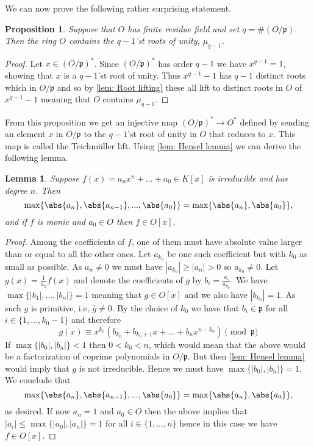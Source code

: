 \documentclass{article}
\newtheorem{proposition}{Proposition}[section]
\newtheorem{lemma}{Lemma}[section]
\newcommand{\mfrak}[1]{\mathfrak{#1}}
\numberwithin{equation}{section}
\begin{document}
We can now prove the following rather surprising statement.
\begin{proposition} \label{O contains q-1 roots of unity}
	Suppose that $O$ has finite residue field and set $q = \#(O/\mfrak p)$. Then the ring $O$ contains the $q-1$'st roots of unity, $\mu_{q-1}$.
\end{proposition}
\begin{proof}
	Let $x \in (O/\mfrak p)^*$. Since $(O/\mfrak p)^*$ has order $q-1$ we have $x^{q-1} = 1$, showing that $x$ is a $q-1$'st root of unity. Thus $x^{q-1} - 1$ has $q-1$ distinct roots which in $O/\mfrak p$ and so by \cref{lem: Root lifting} these all lift to distinct roots in $O$ of $x^{q-1} - 1$ meaning that $O$ contains $\mu_{q-1}$.
\end{proof}
From this proposition we get an injective map $(O / \mfrak p)^* \to O^*$ defined by sending an element $x$ in $O / \mfrak p$ to the $q-1$'st root of unity in $O$ that reduces to $x$. This map is called the Teichmüller lift. Using \cref{lem: Hensel lemma} we can derive the following lemma.
\begin{lemma}\label{lem: Sufficient condition for polynomial to have coefficients in valuation ring}
	Suppose $f(x) = a_n x^n + ... + a_0 \in K[x]$ is irreducible and has degree $n$. Then $$\max \{\abs{a_n}, \abs{a_{n-1}}, ..., \abs{a_0} \} = \max\{\abs{a_n}, \abs{a_0} \},$$
	and if $f$ is monic and $a_0 \in O$ then $f \in O[x]$.
\end{lemma}
\begin{proof}
	Among the coefficients of $f$, one of them must have absolute value larger than or equal to all the other ones. Let $a_{k_0}$ be one such coefficient but with $k_0$ as small as possible. As $a_n \neq 0$ we must have $|a_{k_0}| \geq |a_n| > 0$ so $a_{k_0} \neq 0$. Let $g(x) = \frac{1}{a_k}f(x)$ and denote the coefficients of $g$ by $b_i = \frac{a_i}{a_{k_0}}$. We have $\max \{|b_1|, ..., |b_n| \} = 1$ meaning that $g \in O[x]$ and we also have $|b_{k_0}| = 1$. As such $g$ is primitive, i.e, $\overline g \neq 0$. By the choice of $k_0$ we have that $b_i \in \mfrak p$ for all $i \in \{1, ..., k_0-1 \}$ and therefore
	$$g(x) \equiv x^{k_0}(b_{k_0} + b_{k_0+1} x+ ... + b_n x^{n - k_0}) \pmod {\mfrak p}$$
	If $\max\{|b_0|, |b_n| \} < 1$ then $0 < k_0 < n$, which would mean that the above would be a factorization of coprime polynomials in $O / \mfrak p$. But then \cref{lem: Hensel lemma} would imply that $g$ is not irreducible. Hence we must have $\max\{|b_0|, |b_n| \} = 1$. We conclude that
	$$\max \{\abs{a_n}, \abs{a_{n-1}}, ..., \abs{a_0} \} = \max\{\abs{a_n}, \abs{a_0} \},$$
	as desired. If now $a_n = 1$ and $a_0 \in O$ then the above implies that $|a_i| \leq \max\{|a_0|, |a_n|\} = 1$ for all $i \in \{1, ..., n \}$ hence in this case we have $f \in O[x]$.
    
    

\end{proof}
\end{document}
